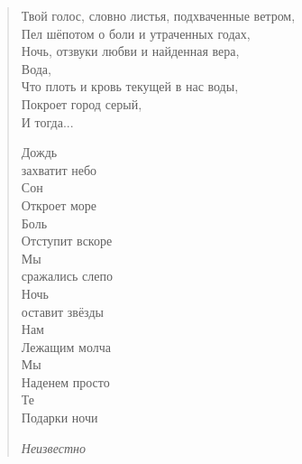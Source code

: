 \documentclass[a4paper,12pt,fleqn]{book}\usepackage{polyglossia}\setdefaultlanguage[babelshorthands=true]{russian}\setotherlanguage{english}\defaultfontfeatures{Ligatures=TeX,Mapping=tex-text}\usepackage{xcolor}\newcommand{\ml}[3]{#2}
\begin{document}
\begin{verse}
 
Твой голос, словно листья, подхваченные ветром,\\
Пел шёпотом о боли и утраченных годах,\\
Ночь, отзвуки любви и найденная вера,\\
Вода,\\
Что плоть и кровь текущей в нас воды,\\
Покроет город серый,\\
И тогда...


Дождь\\
захватит небо\\
Сон\\
Откроет море\\
Боль\\
Отступит вскоре\\
Мы\\
сражались слепо\\

Ночь\\
оставит звёзды\\
Нам\\
Лежащим молча\\
Мы\\
Наденем просто\\
Те\\
Подарки ночи

\emph{Неизвестно}

\end{verse}
\end{document}
